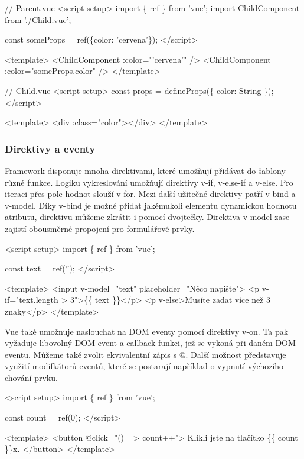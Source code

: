 \begin{prog}
// Parent.vue
<script setup>
  import \{ ref \} from 'vue';
  import ChildComponent from './Child.vue';

  const someProps = ref(\{color: 'cervena'\});
</script>

<template>
	<ChildComponent :color="'cervena'" />
  <ChildComponent :color="someProps.color" />
</template>

// Child.vue
<script setup>
  const props = defineProps(\{
    color: String
  \});
</script>

<template>
  <div :class="color"></div>
</template>
\end{prog}

\subsubsection{Direktivy a eventy}

Framework disponuje mnoha direktivami, které umožňují přidávat do šablony různé funkce. Logiku vykreslování umožňují direktivy v-if, v-else-if a v-else. 
Pro iteraci přes pole hodnot slouží v-for. Mezi další užitečné direktivy patří v-bind a v-model. 
Díky v-bind je možné přidat jakémukoli elementu dynamickou hodnotu atributu, direktivu můžeme zkrátit i pomocí dvojtečky. 
Direktiva v-model zase zajistí obousměrné propojení pro formulářové prvky.

\begin{prog}
<script setup>
  import \{ ref \} from 'vue';

  const text = ref('');
</script>

<template>
  <input v-model="text" placeholder="Něco napište">
  <p v-if="text.length > 3">\{\{ text \}\}</p>
  <p v-else>Musíte zadat více než 3 znaky</p>
</template> 
\end{prog}

Vue také umožnuje naslouchat na DOM eventy pomocí direktivy v-on. Ta pak vyžaduje libovolný DOM event a callback funkci, jež se vykoná při daném DOM eventu. 
Můžeme také zvolit ekvivalentní zápis s @. Další možnost představuje využití modifkátorů eventů, které se postarají například o vypnutí výchozího chování prvku.\cite{vuemacrae,vue}

\begin{prog}
<script setup>
  import \{ ref \} from 'vue';

  const count = ref(0);
</script>

<template>
  <button @click="() => count++">
    Klikli jste na tlačítko \{\{ count \}\}x.
  </button>
</template>
\end{prog}

